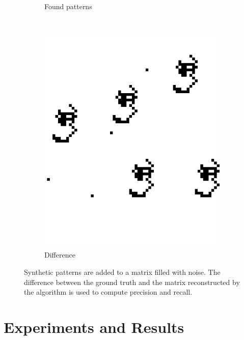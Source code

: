 \documentclass{llncs}
\begin{document}
\begin{figure}[t]
\begin{subfigure}[t]{0.25\textwidth}
\caption{Found patterns}
\label{fig:rilc}
\end{subfigure}%
~
\begin{subfigure}[t]{0.25\textwidth}
\centering
\includegraphics[scale=.9]{img/exp_diff_2_cropped.png}
\caption{Difference}
\label{fig:rild}
\end{subfigure}%
\caption{Synthetic patterns are added to a matrix filled with noise. The difference between the ground truth and the matrix reconstructed by the algorithm is used to compute precision and recall.}
\label{fig:ril}
\end{figure}  

\section{Experiments and Results}

\end{document}
